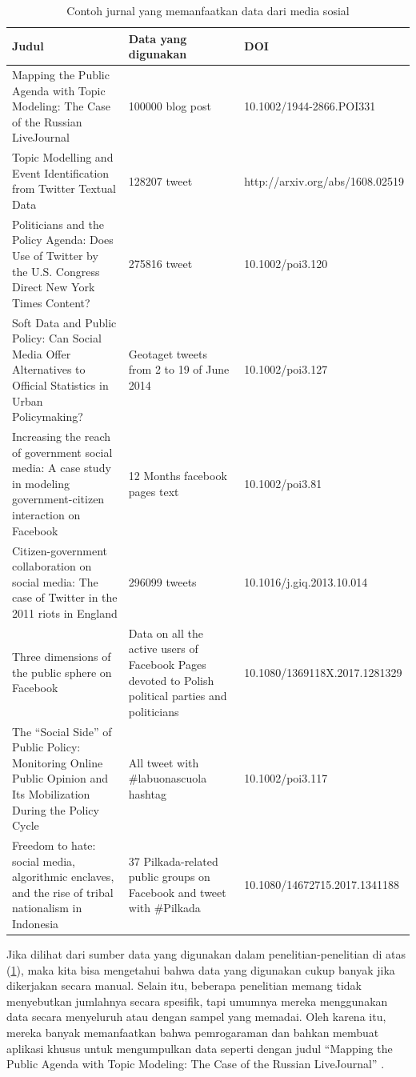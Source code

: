 \documentclass[]{book}
\begin{document}
\begin{table}

\caption{\label{tab:tableJurnal}Contoh jurnal yang memanfaatkan data dari media sosial}
\centering
\begin{tabular}[t]{l|l|l}
\hline
Judul & Data yang digunakan & DOI\\
\hline
Mapping the Public Agenda with Topic Modeling: The Case of the Russian LiveJournal & 100000 blog post & ﻿10.1002/1944-2866.POI331\\
\hline
Topic Modelling and Event Identification from Twitter Textual Data & 128207 tweet & ﻿http://arxiv.org/abs/1608.02519\\
\hline
Politicians and the Policy Agenda: Does Use of Twitter by the U.S. Congress Direct New York Times Content? & ﻿275816 tweet & ﻿10.1002/poi3.120\\
\hline
Soft Data and Public Policy: Can Social Media Offer Alternatives to Official Statistics in Urban Policymaking? & Geotaget tweets from 2 to 19 of June 2014 & ﻿10.1002/poi3.127\\
\hline
Increasing the reach of government social media: A case study in modeling government-citizen interaction on Facebook & 12 Months facebook pages text & ﻿10.1002/poi3.81\\
\hline
Citizen-government collaboration on social media: The case of Twitter in the 2011 riots in England & ﻿296099 tweets & ﻿10.1016/j.giq.2013.10.014\\
\hline
Three dimensions of the public sphere on Facebook & ﻿Data on all the active users of Facebook Pages devoted to Polish political parties and politicians & ﻿10.1080/1369118X.2017.1281329\\
\hline
The “Social Side” of Public Policy: Monitoring Online Public Opinion and Its Mobilization During the Policy Cycle & ﻿All tweet with \#labuonascuola hashtag & ﻿10.1002/poi3.117\\
\hline
Freedom to hate: social media, algorithmic enclaves, and the rise of tribal nationalism in Indonesia & ﻿37 Pilkada-related public groups on Facebook and tweet with ﻿\#Pilkada & ﻿10.1080/14672715.2017.1341188\\
\hline
\end{tabular}
\end{table}

Jika dilihat dari sumber data yang digunakan dalam penelitian-penelitian
di atas (\ref{tab:tableJurnal}), maka kita bisa mengetahui bahwa data
yang digunakan cukup banyak jika dikerjakan secara manual. Selain itu,
beberapa penelitian memang tidak menyebutkan jumlahnya secara spesifik,
tapi umumnya mereka menggunakan data secara menyeluruh atau dengan
sampel yang memadai. Oleh karena itu, mereka banyak memanfaatkan bahwa
pemrogaraman dan bahkan membuat aplikasi khusus untuk mengumpulkan data
seperti dengan judul ``Mapping the Public Agenda with Topic Modeling:
The Case of the Russian LiveJournal'' \citep{KOL}.
\end{document}
